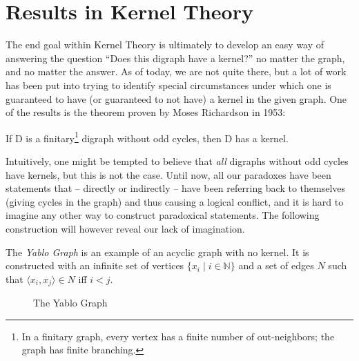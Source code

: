 \section{Results in Kernel Theory}
\label{sec:Results in Kernel Theory}
The end goal within Kernel Theory is ultimately to develop an easy way of answering the question ``Does this digraph have a kernel?'' no matter the graph, and no matter the answer.
As of today, we are not quite there, but a lot of work has been put into trying to identify special circumstances under which one is guaranteed to have (or guaranteed to not have) a kernel in the given graph.
One of the results is the theorem proven by Moses Richardson in 1953:
\begin{theorem}
  If D is a finitary\footnote{In a finitary graph, every vertex has a finite number of out-neighbors; the graph has finite branching.} digraph without odd cycles, then D has a kernel.
\end{theorem}
Intuitively, one might be tempted to believe that \textit{all} digraphs without odd cycles have kernels, but this is not the case.
Until now, all our paradoxes have been statements that -- directly or indirectly -- have been referring back to themselves (giving cycles in the graph) and thus causing a logical conflict, and it is hard to imagine any other way to construct paradoxical statements.
The following construction will however reveal our lack of imagination.

The \textit{Yablo Graph}\cite{analysis-yablo} is an example of an acyclic graph with no kernel.
It is constructed with an infinite set of vertices $\{ x_i \;|\; i \in \mathbb{N} \}$ and a set of edges $N$ such that $\langle x_i, x_j \rangle \in N$ iff $i < j$.

\begin{figure}[!h]
  \centering
  \caption{The Yablo Graph}
  \label{fig:yablo-graph}
\end{figure}

